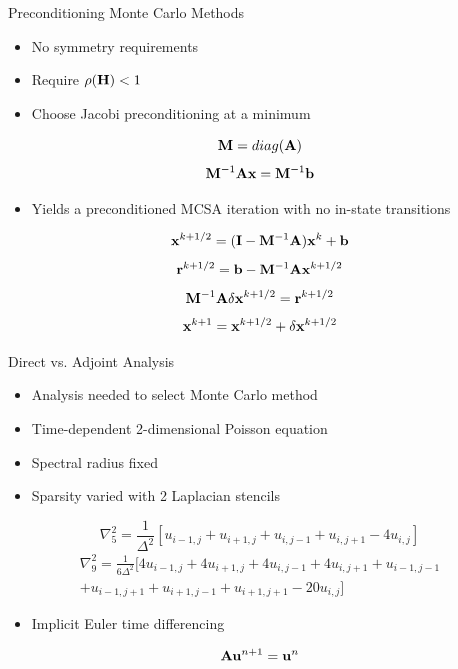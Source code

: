 \documentclass{beamer}
\begin{document}
\begin{frame}{Preconditioning Monte Carlo Methods}

  \begin{itemize}
  \item No symmetry requirements
  \item Require $\rho(\mathbf{H}) < 1$
  \item Choose Jacobi preconditioning at a minimum
  \end{itemize}

  \[
  \mathbf{M} = diag(\mathbf{A})
  \]
  \[
  \mathbf{M}^{-1}\mathbf{A}\mathbf{x} = \mathbf{M}^{-1}\mathbf{b}
  \]
  
  \begin{itemize}
  \item Yields a preconditioned MCSA iteration with no in-state
    transitions
  \end{itemize}

  \[
  \mathbf{x}^{k+1/2} = (\mathbf{I} - \mathbf{M}^{-1}\mathbf{A})\mathbf{x}^k + \mathbf{b}
  \]
  \[
  \mathbf{r}^{k+1/2} = \mathbf{b} - \mathbf{M}^{-1}\mathbf{A}\mathbf{x}^{k+1/2}
  \]
  \[
  \mathbf{M}^{-1}\mathbf{A}\delta\mathbf{x}^{k+1/2} = \mathbf{r}^{k+1/2}
  \]
  \[
  \mathbf{x}^{k+1} = \mathbf{x}^{k+1/2} + \delta \mathbf{x}^{k+1/2}
  \]

\end{frame}

\begin{frame}{Direct vs. Adjoint Analysis}

  \begin{itemize}
  \item Analysis needed to select Monte Carlo method
  \item Time-dependent 2-dimensional Poisson equation
  \item Spectral radius fixed
  \item Sparsity varied with 2 Laplacian stencils
  \end{itemize}

  \[
  \nabla^2_5 = \frac{1}{\Delta^2}[u_{i-1,j} + u_{i+1,j} + u_{i,j-1} +
    u_{i,j+1} - 4 u_{i,j}]
  \]
  \[
  \begin{split}
    \nabla^2_9 = \frac{1}{6\Delta^2}[4 u_{i-1,j} + 4 u_{i+1,j} + 4
      u_{i,j-1} + 4 u_{i,j+1} + u_{i-1,j-1}\\ + u_{i-1,j+1} +
      u_{i+1,j-1} + u_{i+1,j+1} - 20 u_{i,j}]
  \end{split}
  \]

  \begin{itemize}
  \item Implicit Euler time differencing
  \end{itemize}

  \[
  \mathbf{A} \mathbf{u}^{n+1} = \mathbf{u}^n
  \]

\end{frame}
\end{document}
